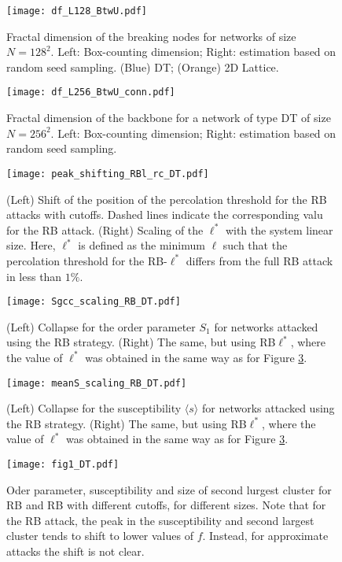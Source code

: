 \documentclass{article}
\begin{document}
\begin{figure}
\centering
\texttt{[image: df\_L128\_BtwU.pdf]}
\caption{\label{fig:fractal_dimension} Fractal dimension of the breaking nodes for networks of size $N=128^2$. Left: Box-counting dimension; Right: estimation based on random seed sampling. (Blue) DT; (Orange) 2D Lattice.}
\end{figure}

\begin{figure}
\centering
\texttt{[image: df\_L256\_BtwU\_conn.pdf]}
\caption{\label{fig:fractal_dimension_backbone} Fractal dimension of the backbone for a network of type DT of size $N=256^2$. Left: Box-counting dimension; Right: estimation based on random seed sampling.}
\end{figure}




\begin{figure}
\centering
\texttt{[image: peak\_shifting\_RBl\_rc\_DT.pdf]}
\caption{\label{fig:rc_per_cutoff} (Left) Shift of the position of the percolation threshold for the RB attacks with cutoffs. Dashed lines indicate the corresponding valu for the RB attack. (Right) Scaling of the $\ell^*$ with the system linear size. Here, $\ell^*$ is defined as the minimum $\ell$ such that the percolation threshold  for the RB-$\ell^*$ differs from the full RB attack in less than $1\%$.}
\end{figure}


\begin{figure}
\centering
\texttt{[image: Sgcc\_scaling\_RB\_DT.pdf]}
\caption{(Left) Collapse for the order parameter $S_1$ for networks attacked using the RB strategy. (Right) The same, but using RB$\ell^*$, where the value of $\ell^*$ was obtained in the same way as for Figure \ref{fig:rc_per_cutoff}. }
\end{figure}


\begin{figure}
\centering
\texttt{[image: meanS\_scaling\_RB\_DT.pdf]}
\caption{(Left) Collapse for the susceptibility $\langle s \rangle$ for networks attacked using the RB strategy. (Right) The same, but using RB$\ell^*$, where the value of $\ell^*$ was obtained in the same way as for Figure \ref{fig:rc_per_cutoff}. }
\end{figure}





\begin{figure}
\centering
\texttt{[image: fig1\_DT.pdf]}
\caption{Oder parameter, susceptibility and size of second lurgest cluster for RB and RB with different cutoffs, for different sizes. Note that for the RB attack, the peak in the susceptibility and second largest cluster tends to shift to lower values of $f$. Instead, for approximate attacks the shift is not clear.}
\end{figure}
\end{document}
